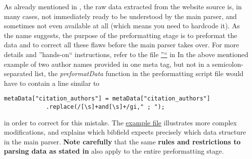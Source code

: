 \documentclass[
a4paper,
12pt,
]
{article}
\begin{document}
As already mentioned in , the raw data extracted from the website source is, in many cases, not immediately ready to be understood by the main parser, and sometimes not even available at all (which means you need to hardcode it). As the name suggests, the purpose of the preformatting stage is to preformat the data and to correct all these flaws before the main parser takes over. For more details and ''hands-on`` instructions, refer to the file \href{https://github.com/Langenscheiss/bibitnow/blob/master/background/preformatters/0_EXAMPLE.js}{''\exmpl``} in
In the above mentioned example of two author names provided in one meta tag, but not in a semicolon-separated list, the \textit{preformatData} function in the preformatting script file would have to contain a line similar to
\begin{center}
\begin{lstlisting}
metaData["citation_authors"] = metaData["citation_authors"]
			.replace(/[\s]+and[\s]+/gi," ; ");
\end{lstlisting}
\end{center}
in order to correct for this mistake. The \href{https://github.com/Langenscheiss/bibitnow/blob/master/background/preformatters/0_EXAMPLE.js}{example file} illustrates more complex modifications, and  explains which bibfield expects precisely which data structure in the main parser. \textbf{Note carefully} that the same \textbf{rules and restrictions to parsing data as stated in } also apply to the entire preformatting stage.\par
\end{document}
